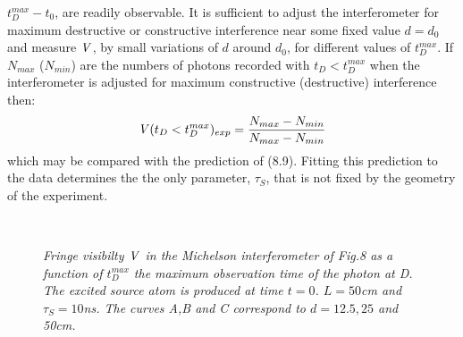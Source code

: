 { $t_D^{max}-t_0$, are readily observable. It is sufficient to adjust the interferometer for maximum
 destructive or constructive interference near some fixed value $d = d_0$ and measure ${\it V}$, by
   small variations of $d$ around $d_0$, for different values of $t_D^{max}$.
   If $N_{max}$ ($N_{min}$) are the numbers of photons recorded with
   $t_D<t_D^{max}$  when the interferometer is adjusted for maximum constructive (destructive) 
   interference then:
    \begin{equation}
     {\it V}(t_D < t_D^{max})_{exp} = \frac{N_{max}-N_{min}}{N_{max}-N_{min}}
    \end{equation}
     which may be compared with the prediction of (8.9). Fitting this prediction to the 
    data determines the the only parameter, $\tau_S$, that is not fixed by the geometry of the
    experiment.\

\begin{figure}[htbp]
\begin{center}
\hspace*{-0.5cm}\mbox{
}
\caption{{\sl Fringe visibilty  ${\it V}$ in the Michelson interferometer of Fig.8 as a function
  of $t_D^{max}$ the maximum observation time of the photon at D. The excited source atom 
  is produced at time $t=0$. $L= 50$cm and $\tau_S = 10$ns. The curves A,B and C correspond to $d= 12.5, 25$ and 50cm.
  }} 
\label{fig-fig9}
\end{center}
\end{figure}

}
